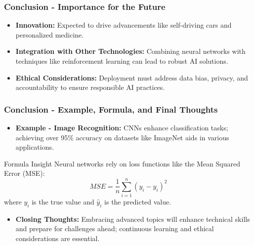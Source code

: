 \documentclass[aspectratio=169]{beamer}
\begin{document}
\begin{frame}[fragile]
    \frametitle{Conclusion - Importance for the Future}
    \begin{itemize}
        \item \textbf{Innovation:} Expected to drive advancements like self-driving cars and personalized medicine.
        \item \textbf{Integration with Other Technologies:} Combining neural networks with techniques like reinforcement learning can lead to robust AI solutions.
        \item \textbf{Ethical Considerations:} Deployment must address data bias, privacy, and accountability to ensure responsible AI practices.
    \end{itemize}
\end{frame}

\begin{frame}[fragile]
    \frametitle{Conclusion - Example, Formula, and Final Thoughts}
    \begin{itemize}
        \item \textbf{Example - Image Recognition:} CNNs enhance classification tasks; achieving over 95\% accuracy on datasets like ImageNet aids in various applications.
    \end{itemize}
    \begin{block}{Formula Insight}
        Neural networks rely on loss functions like the Mean Squared Error (MSE):
        \begin{equation}
            MSE = \frac{1}{n} \sum_{i=1}^{n} (y_i - \hat{y}_i)^2
        \end{equation}
        where $y_i$ is the true value and $\hat{y}_i$ is the predicted value.
    \end{block}
    \begin{itemize}
        \item \textbf{Closing Thoughts:} Embracing advanced topics will enhance technical skills and prepare for challenges ahead; continuous learning and ethical considerations are essential.
    \end{itemize}
\end{frame}
\end{document}
